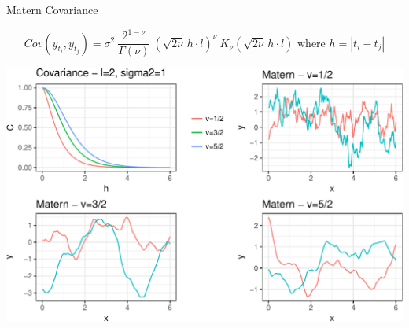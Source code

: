 \documentclass[11pt,ignorenonframetext,]{beamer}
\begin{document}
\begin{frame}[t]{%
\protect\hypertarget{matern-covariance}{%
Matern Covariance}}

\vspace{-10mm}

\[ Cov(y_{t_i}, y_{t_j}) = \sigma^2 ~ \frac{2^{1-\nu}}{\Gamma(\nu)} ~ \left(\sqrt{2\nu}\, h \cdot l\right)^\nu ~ K_\nu\left(\sqrt{2\nu} \, h \cdot l\right) \text{   where } h = |t_i - t_j|\]

\begin{center}\includegraphics[width=\textwidth]{Lec14_files/figure-beamer/unnamed-chunk-3-1} \end{center}

\end{frame}
\end{document}
